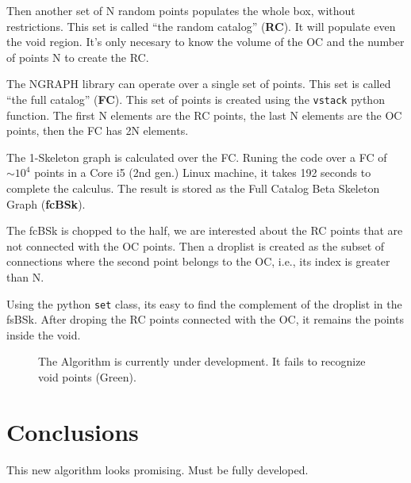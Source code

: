 \documentclass[preprint]{aastex62}
\begin{document}
Then another set of N random points populates the whole box, without restrictions.
This set is called ``the random catalog'' (\textbf{RC}). It will populate even
the void region. It's only necesary to know the volume of the OC and the number
of points N to create the RC.

The NGRAPH library can operate over a single set of points. This set is called
``the full catalog'' (\textbf{FC}). This set of points is created using the
\texttt{vstack} python function. The first N elements are the RC points, the last
N elements are the OC points, then the FC has 2N elements.

The 1-Skeleton graph is calculated over the FC. Runing the code over a FC of
$\sim 10^4$ points in a Core i5 (2nd gen.) Linux machine, it takes 192 seconds
to complete the calculus. The result is stored as the Full Catalog Beta
Skeleton Graph (\textbf{fcBSk}).

The fcBSk is chopped to the half, we are interested about the RC points that
are not connected with the OC points. Then a droplist is created as the
subset of connections where the second point belongs to the OC, i.e., its index
is greater than N.

Using the python  \texttt{set} class, its easy to find the complement of the
droplist in the fsBSk. After droping the RC points connected with the OC, it
remains the points inside the void.


\begin{figure}
    \caption{The Algorithm is currently under development. It fails
      to recognize void points (Green).
      \label{slice_OC_RC_VoidPoints}}
\end{figure}


\section{Conclusions}

This new algorithm looks promising. Must be fully developed.

  \nocite{*}

  \begin{thebibliography}{20}


  \end{thebibliography}                                                           
                       

\end{document}
